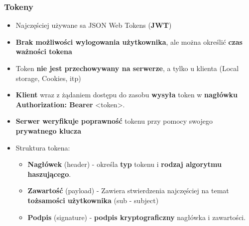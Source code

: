\documentclass[../main.tex]{subfiles}
\begin{document}
    \subsubsection{Tokeny}
    \begin{itemize}
        \item Najczęściej używane sa JSON Web Tokens (\textbf{JWT})
        \item \textbf{Brak możliwości wylogowania użytkownika}, ale można określić \textbf{czas ważności tokena}
        \item Token \textbf{nie jest przechowywany na serwerze}, a tylko u klienta (Local storage, Cookies, itp)
        \item \textbf{Klient} wraz z żądaniem dostępu do zasobu \textbf{wysyła} token w \textbf{nagłówku Authorization: Bearer} <token>.
        \item \textbf{Serwer weryfikuje poprawność} tokenu przy pomocy swojego \textbf{prywatnego klucza}
        \item Struktura tokena:
        \begin{itemize}
            \item \textbf{Nagłówek} (header) - określa \textbf{typ} tokenu i \textbf{rodzaj algorytmu haszującego}.
            \item \textbf{Zawartość} (payload) - Zawiera stwierdzenia najczęściej na temat
            \textbf{tożsamości użytkownika} (sub - subject)
            \item \textbf{Podpis} (signature) - \textbf{podpis kryptograficzny} nagłówka i zawartości.
        \end{itemize}
    \end{itemize}
\end{document}
